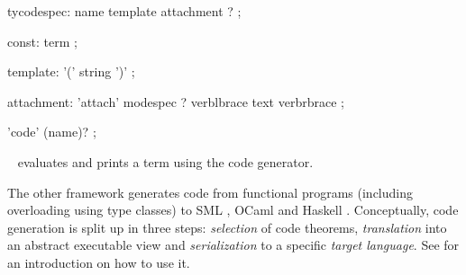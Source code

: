 \begin{isabellebody}
\begin{isamarkuptext}
\begin{rail}
  tycodespec: name template attachment ?
  ;

  const: term
  ;

  template: '(' string ')'
  ;

  attachment: 'attach' modespec ? verblbrace text verbrbrace
  ;

  'code' (name)?
  ;
  \end{rail}

  \begin{description}

  \item \hyperlink{command.HOL.value}{\mbox{}}~ evaluates and prints a term
  using the code generator.

  \end{description}

  \medskip The other framework generates code from functional programs
  (including overloading using type classes) to SML \cite{SML}, OCaml
  \cite{OCaml} and Haskell \cite{haskell-revised-report}.
  Conceptually, code generation is split up in three steps:
  \emph{selection} of code theorems, \emph{translation} into an
  abstract executable view and \emph{serialization} to a specific
  \emph{target language}.  See \cite{isabelle-codegen} for an
  introduction on how to use it.


\end{isamarkuptext}
\end{isabellebody}
